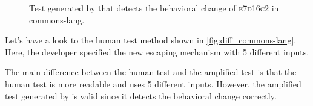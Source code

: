 \begin{figure}[h]
\centering
{}
\caption{Test generated by \DCII that detects the behavioral change of \textsc{e7d16c2} in commons-lang.}
\label{fig:ampl_commons-lang}
\end{figure}

Let's have a look to the human test method shown in \autoref{fig:diff_commons-lang}.
Here, the developer specified the new escaping mechanism with 5 different inputs.

The main difference between the human test and the amplified test is that the human test is more readable and uses 5 different inputs.
However, the amplified test generated by \DCI is valid since it detects the behavioral change correctly.


